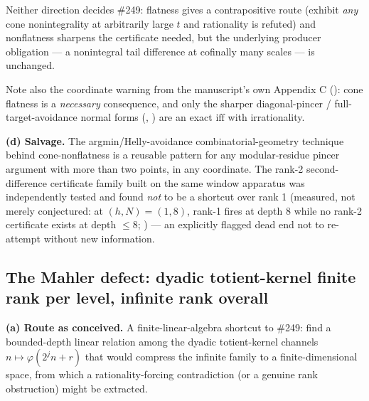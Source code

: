 Neither direction decides \#249: flatness
gives a contrapositive route (exhibit \emph{any} cone nonintegrality at
arbitrarily large \(t\) and rationality is refuted) and nonflatness sharpens
the certificate needed, but the underlying producer obligation — a
nonintegral tail difference at cofinally many scales — is unchanged.

Note
also the coordinate warning from the manuscript's own Appendix C
(): cone flatness is a
\emph{necessary} consequence, and only the sharper diagonal-pincer /
full-target-avoidance normal forms
(,
) are an exact
\(\mathrm{iff}\) with irrationality.

\textbf{(d) Salvage.} The argmin/Helly-avoidance combinatorial-geometry
technique behind cone-nonflatness is a reusable pattern for any modular-residue
pincer argument with more than two points, in any coordinate. The rank-2
second-difference certificate family built on the same window apparatus was
independently tested and found \emph{not} to be a shortcut over rank 1
(measured, not merely conjectured: at \((h,N)=(1,8)\), rank-1 fires at depth
8 while no rank-2 certificate exists at depth \(\le8\);
) — an
explicitly flagged dead end not to re-attempt without new information.

\subsection{The Mahler defect: dyadic totient-kernel finite rank per level,
infinite rank overall}
\label{sec:mahler-defect}

\textbf{(a) Route as conceived.} A finite-linear-algebra shortcut to \#249:
find a bounded-depth linear relation among the dyadic totient-kernel
channels \(n\mapsto\varphi(2^jn+r)\) that would compress the infinite
family to a finite-dimensional space, from which a rationality-forcing
contradiction (or a genuine rank obstruction) might be extracted.

